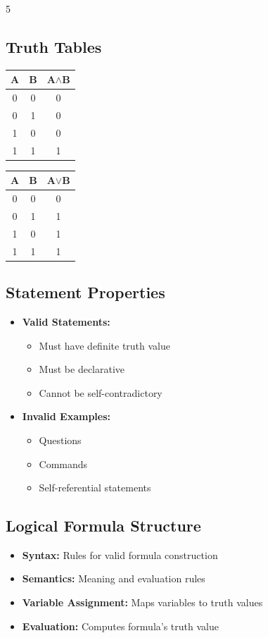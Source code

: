 \documentclass[a4paper,landscape]{article}
\begin{document}
\begin{multicols*}{5}
\subsection*{Truth Tables}
\begin{center}
\begin{tabular}{cc|c}
A & B & A$\wedge$B \\
\hline
0 & 0 & 0 \\
0 & 1 & 0 \\
1 & 0 & 0 \\
1 & 1 & 1
\end{tabular}
\quad
\begin{tabular}{cc|c}
A & B & A$\vee$B \\
\hline
0 & 0 & 0 \\
0 & 1 & 1 \\
1 & 0 & 1 \\
1 & 1 & 1
\end{tabular}
\end{center}

\subsection*{Statement Properties}
\begin{itemize}[leftmargin=*, itemsep=0pt]
    \item \textbf{Valid Statements:}
    \begin{itemize}[leftmargin=*, itemsep=0pt]
        \item Must have definite truth value
        \item Must be declarative
        \item Cannot be self-contradictory
    \end{itemize}
    \item \textbf{Invalid Examples:}
    \begin{itemize}[leftmargin=*, itemsep=0pt]
        \item Questions
        \item Commands
        \item Self-referential statements
    \end{itemize}
\end{itemize}

\subsection*{Logical Formula Structure}
\begin{itemize}[leftmargin=*, itemsep=0pt]
    \item \textbf{Syntax:} Rules for valid formula construction
    \item \textbf{Semantics:} Meaning and evaluation rules
    \item \textbf{Variable Assignment:} Maps variables to truth values
    \item \textbf{Evaluation:} Computes formula's truth value
\end{itemize}


\end{multicols*}
\end{document}
